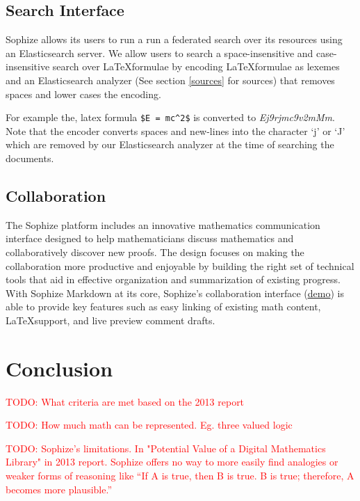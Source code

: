 \documentclass[a4paper]{article}
\newcommand\todo[1]{\textcolor{red}{TODO: #1}}
\begin{document}
\subsection{Search Interface}
Sophize allows its users to run a run a federated search over its resources using an Elasticsearch server. We allow users to search a space-insensitive and case-insensitive search over \LaTeX\space formulae by encoding \LaTeX\space formulae as lexemes and an Elasticsearch analyzer (See section \ref{sources} for sources) that removes spaces and lower cases the encoding.

For example the, latex formula \verb+$E = mc^2$+ is converted to \textit{Ej9rjmc9v2mMm}. 
Note that the encoder converts spaces and new-lines into the character `j' or `J' which are removed by our Elasticsearch analyzer at the time of searching the documents.

\subsection{Collaboration}

The Sophize platform includes an innovative mathematics communication interface designed to help
mathematicians discuss mathematics and collaboratively discover new proofs. The design focuses on
making the collaboration more productive and enjoyable by building the right set of technical
tools that aid in effective organization and summarization of existing progress.
With Sophize Markdown at its core, Sophize's collaboration interface\cite{todo}  (\underline{\href{https://youtu.be/d3gaalJ7UQM}{demo}}) is able to provide key features such as easy linking of existing math content, \LaTeX\space support, and live preview comment drafts.


\section{Conclusion}
\label{sec:conclusion}
\todo{What criteria are met based on the 2013 report}

\todo{How much math can be represented. Eg. three valued logic}

\todo{Sophize's limitations. In "Potential Value of a
Digital Mathematics Library" in 2013 report. Sophize offers no way to more easily find analogies or weaker forms of reasoning like “If A is true, then B is true. B is true; therefore, A becomes more plausible.” }

 


\end{document}

